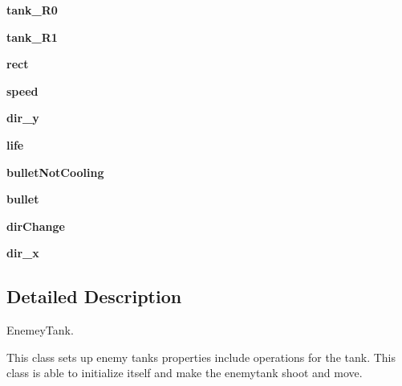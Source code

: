 \begin{DoxyCompactItemize}
{\bfseries tank\+\_\+\+R0}
\item 
\mbox{\label{classenemy_tank_1_1_enemy_tank_ac7dd5f196d9ea85d9ef356fe3951cef3}} 
{\bfseries tank\+\_\+\+R1}
\item 
\mbox{\label{classenemy_tank_1_1_enemy_tank_a235bbe4a8ba29a5d7cda979c107b1c1f}} 
{\bfseries rect}
\item 
\mbox{\label{classenemy_tank_1_1_enemy_tank_a996e6fc5c16e339a2b38c6fb7fdcf0dc}} 
{\bfseries speed}
\item 
\mbox{\label{classenemy_tank_1_1_enemy_tank_a1f91edee1c20e7e4484f2e5d4bc7a52d}} 
{\bfseries dir\+\_\+y}
\item 
\mbox{\label{classenemy_tank_1_1_enemy_tank_aa07c887fab74b0e4ff74b79f161867cc}} 
{\bfseries life}
\item 
\mbox{\label{classenemy_tank_1_1_enemy_tank_a23ec1383de4ff1c16150ce8952867b5c}} 
{\bfseries bullet\+Not\+Cooling}
\item 
\mbox{\label{classenemy_tank_1_1_enemy_tank_a166b810f1a8bc0aed177837e13cd0ce6}} 
{\bfseries bullet}
\item 
\mbox{\label{classenemy_tank_1_1_enemy_tank_a6edc3c0ad71ddc3d4ce657d665379d4f}} 
{\bfseries dir\+Change}
\item 
\mbox{\label{classenemy_tank_1_1_enemy_tank_a59d1037b85ec3a493da8ee9ef690633b}} 
{\bfseries dir\+\_\+x}
\end{DoxyCompactItemize}


\subsection{Detailed Description}
Enemey\+Tank. 

This class sets up enemy tank\textquotesingle{}s properties include operations for the tank. This class is able to initialize itself and make the enemytank shoot and move. 


